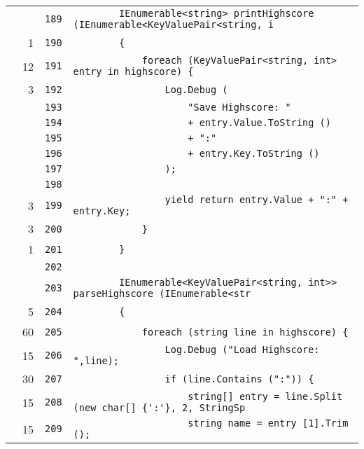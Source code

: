 \documentclass[a4paper,10pt]{article}
\begin{document}
\begin{longtable}[l]{lrrl}
\cellcolor{gray} &  & \verb~189~ & \verb~        IEnumerable<string> printHighscore (IEnumerable<KeyValuePair<string, i~\\
\cellcolor{green} & 1 & \verb~190~ & \verb~        {~\\
\cellcolor{green} & 12 & \verb~191~ & \verb~            foreach (KeyValuePair<string, int> entry in highscore) {~\\
\cellcolor{green} & 3 & \verb~192~ & \verb~                Log.Debug (~\\
\cellcolor{gray} &  & \verb~193~ & \verb~                    "Save Highscore: "~\\
\cellcolor{gray} &  & \verb~194~ & \verb~                    + entry.Value.ToString ()~\\
\cellcolor{gray} &  & \verb~195~ & \verb~                    + ":"~\\
\cellcolor{gray} &  & \verb~196~ & \verb~                    + entry.Key.ToString ()~\\
\cellcolor{gray} &  & \verb~197~ & \verb~                );~\\
\cellcolor{gray} &  & \verb~198~ & \verb~~\\
\cellcolor{green} & 3 & \verb~199~ & \verb~                yield return entry.Value + ":" + entry.Key;~\\
\cellcolor{green} & 3 & \verb~200~ & \verb~            }~\\
\cellcolor{green} & 1 & \verb~201~ & \verb~        }~\\
\cellcolor{gray} &  & \verb~202~ & \verb~~\\
\cellcolor{gray} &  & \verb~203~ & \verb~        IEnumerable<KeyValuePair<string, int>> parseHighscore (IEnumerable<str~\\
\cellcolor{green} & 5 & \verb~204~ & \verb~        {~\\
\cellcolor{green} & 60 & \verb~205~ & \verb~            foreach (string line in highscore) {~\\
\cellcolor{green} & 15 & \verb~206~ & \verb~                Log.Debug ("Load Highscore: ",line);~\\
\cellcolor{green} & 30 & \verb~207~ & \verb~                if (line.Contains (":")) {~\\
\cellcolor{green} & 15 & \verb~208~ & \verb~                    string[] entry = line.Split (new char[] {':'}, 2, StringSp~\\
\cellcolor{green} & 15 & \verb~209~ & \verb~                    string name = entry [1].Trim ();~\\

\end{longtable}
\end{document}
